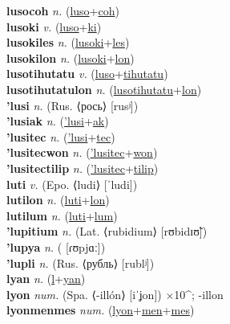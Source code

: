 \textbf{lusocoh} \textit{n.} (\hyperref[luso]{luso}+\hyperref[coh]{coh})
 \label{lusocoh} \\
\textbf{lusoki} \textit{v.} (\hyperref[luso]{luso}+\hyperref[ki]{ki})
 \label{lusoki} \\
\textbf{lusokiles} \textit{n.} (\hyperref[lusoki]{lusoki}+\hyperref[les]{les})
 \label{lusokiles} \\
\textbf{lusokilon} \textit{n.} (\hyperref[lusoki]{lusoki}+\hyperref[lon]{lon})
 \label{lusokilon} \\
\textbf{lusotihutatu} \textit{v.} (\hyperref[luso]{luso}+\hyperref[tihutatu]{tihutatu})
 \label{lusotihutatu} \\
\textbf{lusotihutatulon} \textit{n.} (\hyperref[lusotihutatu]{lusotihutatu}+\hyperref[lon]{lon})
 \label{lusotihutatulon} \\
\textbf{'lusi} \textit{n.} (Rus. ⟨рось⟩ [rusʲ])
 \label{'lusi} \\
\textbf{'lusiak} \textit{n.} (\hyperref['lusi]{'lusi}+\hyperref[ak]{ak})
 \label{'lusiak} \\
\textbf{'lusitec} \textit{n.} (\hyperref['lusi]{'lusi}+\hyperref[tec]{tec})
 \label{'lusitec} \\
\textbf{'lusitecwon} \textit{n.} (\hyperref['lusitec]{'lusitec}+\hyperref[won]{won})
 \label{'lusitecwon} \\
\textbf{'lusitectilip} \textit{n.} (\hyperref['lusitec]{'lusitec}+\hyperref[tilip]{tilip})
 \label{'lusitectilip} \\
\textbf{luti} \textit{v.} (Epo. ⟨ludi⟩ [ˈludi])
 \label{luti} \\
\textbf{lutilon} \textit{n.} (\hyperref[luti]{luti}+\hyperref[lon]{lon})
 \label{lutilon} \\
\textbf{lutilum} \textit{n.} (\hyperref[luti]{luti}+\hyperref[lum]{lum})
 \label{lutilum} \\
\textbf{'lupitium} \textit{n.} (Lat. ⟨rubidium⟩ [rʊbidɪʊ̃])
 \label{'lupitium} \\
\textbf{'lupya} \textit{n.} ( [ɾʊpjɑː])
 \label{'lupya} \\
\textbf{'lupli} \textit{n.} (Rus. ⟨рубль⟩ [rublʲ])
 \label{'lupli} \\
\textbf{lyan} \textit{n.} (\hyperref[l]{l}+\hyperref[yan]{yan})
 \label{lyan} \\
\textbf{lyon} \textit{num.} (Spa. ⟨-illón⟩ [iˈʝon])
×10\textasciicircum{}; -illon \label{lyon} \\
\textbf{lyonmenmes} \textit{num.} (\hyperref[lyon]{lyon}+\hyperref[men]{men}+\hyperref[mes]{mes})
